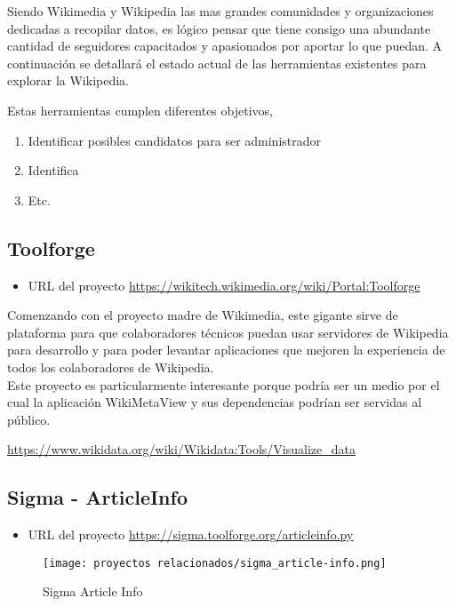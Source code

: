 Siendo Wikimedia y Wikipedia las mas grandes comunidades y organizaciones dedicadas a recopilar datos, es lógico pensar que tiene consigo una abundante cantidad de seguidores capacitados y apasionados por aportar lo que puedan. A continuación se detallará el estado actual de las herramientas existentes para explorar la Wikipedia.

Estas herramientas cumplen diferentes objetivos,

\begin{enumerate}
    \item Identificar posibles candidatos para ser administrador
    \item Identifica
    \item Etc.
\end{enumerate}


\subsection{Toolforge}

\begin{itemize}
    \item URL del proyecto \url{https://wikitech.wikimedia.org/wiki/Portal:Toolforge}
\end{itemize}

Comenzando con el proyecto madre de Wikimedia, este gigante sirve de plataforma para que colaboradores técnicos puedan usar servidores de Wikipedia para desarrollo y para poder levantar aplicaciones que mejoren la experiencia de todos los colaboradores de Wikipedia.
\\
Este proyecto es particularmente interesante porque podría ser un medio por el cual la aplicación WikiMetaView y sus dependencias podrían ser servidas al público.

\url{https://www.wikidata.org/wiki/Wikidata:Tools/Visualize_data}

\subsection{Sigma - ArticleInfo}
\begin{itemize}
    \item URL del proyecto \url{https://sigma.toolforge.org/articleinfo.py}
\end{itemize}

\begin{figure}[H]
    \centering
    \texttt{[image: proyectos relacionados/sigma\_article-info.png]}
    \caption{Sigma Article Info}
    \label{sigma_articleInfo}
\end{figure}


